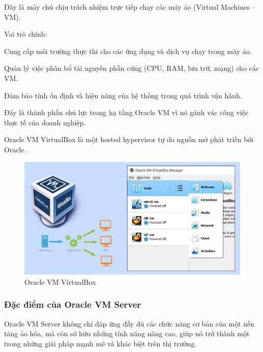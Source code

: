 \begin{myitem}
\item Đây là máy chủ chịu trách nhiệm trực tiếp chạy các máy ảo (Virtual Machines – VM).

\item Vai trò chính:

  \begin{mysubitem}
  \item Cung cấp môi trường thực thi cho các ứng dụng và dịch vụ chạy trong máy ảo.
  
  \item Quản lý việc phân bổ tài nguyên phần cứng (CPU, RAM, lưu trữ, mạng) cho các VM.

  \item Đảm bảo tính ổn định và hiệu năng của hệ thống trong quá trình vận hành.

  \end{mysubitem}

\item Đây là thành phần chủ lực trong hạ tầng Oracle VM vì nó gánh vác công việc thực tế của doanh nghiệp.
\item Oracle VM VirtualBox là một hosted hypervisor tự do nguồn mở phát triền bởi Oracle \cite{spca_vm_virtualbox}.

\end{myitem}

\begin{figure}[H] %
    \centering
    \includegraphics[width=1.0\textwidth]{Oracle_cloud/virtualbox.jpg}
    \caption{Oracle VM VirtualBox}
    \label{fig:cloud_intro}
\end{figure}

\subsubsection{Đặc điểm của Oracle VM Server}
Oracle VM Server không chỉ đáp ứng đầy đủ các chức năng cơ bản của một nền tảng ảo hóa, mà còn sở hữu những tính năng nâng cao, giúp nó trở thành một trong những giải pháp mạnh mẽ và khác biệt trên thị trường.

